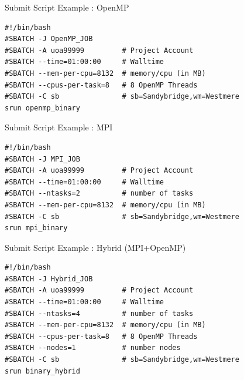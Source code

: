 \documentclass[final,t]{beamer}
\begin{document}
\begin{frame}[fragile]{}
\begin{columns}[t]
\begin{column}{.3\linewidth}
      \begin{block}{Submit Script Example : OpenMP}
              \vspace*{-3ex}
        \begin{verbatim}
#!/bin/bash
#SBATCH -J OpenMP_JOB
#SBATCH -A uoa99999         # Project Account
#SBATCH --time=01:00:00     # Walltime
#SBATCH --mem-per-cpu=8132  # memory/cpu (in MB)
#SBATCH --cpus-per-task=8   # 8 OpenMP Threads
#SBATCH -C sb               # sb=Sandybridge,wm=Westmere
srun openmp_binary
        \end{verbatim}
                \vspace*{-4ex}
      \end{block}

      \begin{block}{Submit Script Example : MPI}
              \vspace*{-3ex}
        \begin{verbatim}
#!/bin/bash
#SBATCH -J MPI_JOB
#SBATCH -A uoa99999         # Project Account
#SBATCH --time=01:00:00     # Walltime
#SBATCH --ntasks=2          # number of tasks
#SBATCH --mem-per-cpu=8132  # memory/cpu (in MB)
#SBATCH -C sb               # sb=Sandybridge,wm=Westmere
srun mpi_binary
        \end{verbatim}
                \vspace*{-4ex}
      \end{block}

      \begin{block}{Submit Script Example : Hybrid (MPI+OpenMP)}
              \vspace*{-3ex}
        \begin{verbatim}
#!/bin/bash
#SBATCH -J Hybrid_JOB
#SBATCH -A uoa99999         # Project Account
#SBATCH --time=01:00:00     # Walltime
#SBATCH --ntasks=4          # number of tasks
#SBATCH --mem-per-cpu=8132  # memory/cpu (in MB)
#SBATCH --cpus-per-task=8   # 8 OpenMP Threads
#SBATCH --nodes=1           # number nodes
#SBATCH -C sb               # sb=Sandybridge,wm=Westmere
srun binary_hybrid
        \end{verbatim}
                \vspace*{-4ex}
      \end{block}


\end{column}
\end{columns}
\end{frame}
\end{document}
